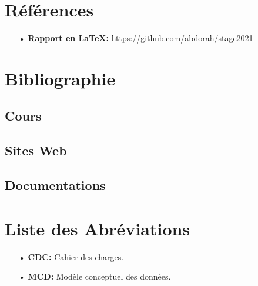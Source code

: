 \documentclass[a4paper]{report}
\begin{document}
\chapter{Références}
\begin{itemize}
	\item[•] \textbf{Rapport en \LaTeX:} \url{https://github.com/abdorah/stage2021}
\end{itemize}
\chapter{Bibliographie}
\section{Cours}
\section{Sites Web}
\section{Documentations}
\chapter{Liste des Abréviations}
\begin{itemize}
	\item[•] \textbf{CDC:} Cahier des charges.
	\item[•] \textbf{MCD:} Modèle conceptuel des données.
\end{itemize}
\end{document}
